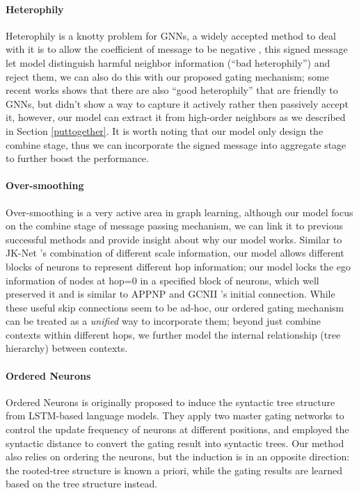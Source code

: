 \documentclass{article}
\begin{document}
\paragraph{Heterophily}
Heterophily is a knotty problem for GNNs, a widely accepted method to deal with it is to allow the coefficient of message to be negative \citep{chien2020adaptive,yang2021diverse,bo2021beyond,luan2021heterophily,yan2021two}, this signed message let model distinguish harmful neighbor information (``bad heterophily'') and reject them, we can also do this with our proposed gating mechanism; some recent works \citep{luan2021heterophily,ma2021homophily} shows that there are also ``good heterophily'' that are friendly to GNNs, but didn't show a way to capture it actively rather then passively accept it, however, our model can extract it from high-order neighbors as we described in Section \ref{puttogether}. It is worth noting that our model only design the combine stage, thus we can incorporate the signed message into aggregate stage to further boost the performance.

\paragraph{Over-smoothing}
Over-smoothing is a very active area in graph learning, although our model focus on the combine stage of message passing mechanism, we can link it to previous successful methods and provide insight about why our model works. Similar to JK-Net \citep{xu2018representation}'s combination of different scale information, our model allows different blocks of neurons to represent different hop information; our model locks the ego information of nodes at hop=0 in a specified block of neurons, which well preserved it and is similar to APPNP \citep{klicpera2018predict} and GCNII \citep{chen2020simple}'s initial connection. While these useful skip connections seem to be ad-hoc, our ordered gating mechanism can be treated as a \textit{unified} way to incorporate them; beyond just combine contexts within different hops, we further model the internal relationship (tree hierarchy) between contexts.

\paragraph{Ordered Neurons}
Ordered Neurons \citep{shen2018ordered} is originally proposed to induce the syntactic tree structure from LSTM-based language models. They apply two master gating networks to control the update frequency of neurons at different positions, and employed the syntactic distance \citep{shen2018straight} to convert the gating result into syntactic trees. Our method also relies on ordering the neurons, but the induction is in an opposite direction: the rooted-tree structure is known a priori, while the gating results are learned based on the tree structure instead.
\end{document}
